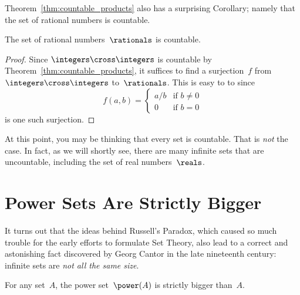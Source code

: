 Theorem~\ref{thm:countable_products} also has a surprising Corollary;
namely that the set of rational numbers is countable.

\begin{corollary}\label{cor:countable_rationals}
The set of rational numbers~$\rationals$ is countable.
\end{corollary}

\begin{proof}
Since $\integers \cross \integers$ is countable by
Theorem~\ref{thm:countable_products}, it suffices to find a
surjection~$f$ from $\integers \cross \integers$ to~$\rationals$.
This is easy to to since
\begin{equation*}
f(a, b) = \begin{cases}
            a/b & \text{if $b \ne 0$} \\
              0 & \text{if $b = 0$}
          \end{cases}
\end{equation*}
is one such surjection.
\end{proof}

At this point, you may be thinking that every set is countable.  That
is \emph{not} the case.  In fact, as we will shortly see, there are
many infinite sets that are uncountable, including the set of real
numbers~$\reals$.

\section{Power Sets Are Strictly Bigger}

It turns out that the ideas behind Russell's Paradox, which caused so
much trouble for the early efforts to formulate Set Theory, also lead
to a correct and astonishing fact discovered by Georg Cantor in the
late nineteenth century: infinite sets are \emph{not all the same
  size}.

\begin{theorem}\label{thm:power_sets}
For any set~$A$, the power set~$\power(A)$ is strictly bigger
than~$A$.
\end{theorem}

